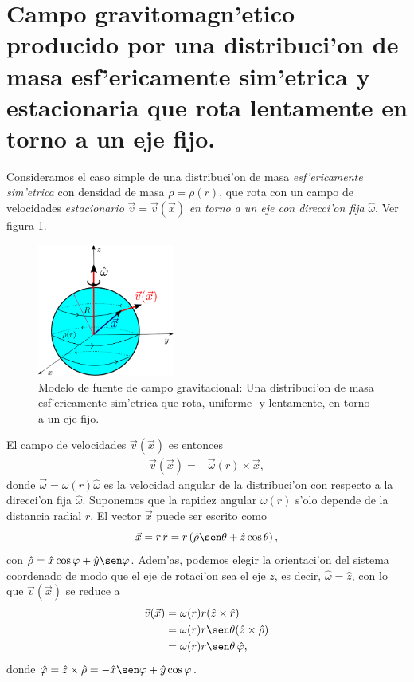 \section{Campo gravitomagn'etico producido por una distribuci'on de masa esf'ericamente sim'etrica y estacionaria que rota lentamente en torno a un eje fijo.}

Consideramos el caso simple de una distribuci'on de masa \textit{esf'ericamente sim'etrica} con densidad de masa $\rho =\rho (r)$, que rota con un campo de velocidades \textit{estacionario} $\vec{v}=\vec{v}(\vec{x})$ \textit{en torno a un eje con direcci'on fija} $\hat{\omega}$. Ver figura \ref{fig:fuente}.
\begin{figure}[H]
\centering
\includegraphics[angle=0,width=0.4\textwidth]{fig/fig-fuente.pdf}
\caption{Modelo de fuente de campo gravitacional: Una distribuci'on de masa esf'ericamente sim'etrica que rota, uniforme- y lentamente, en torno a un eje fijo.}
\label{fig:fuente}
\end{figure}

El campo de velocidades $\vec{v}(\vec{x})$ es entonces
\begin{align}
\vec{v}(\vec{x})={}&\vec{\omega}(r)\times\vec{x},
\end{align}
donde $\vec{\omega}=\omega(r)\hat{\omega}$ es la velocidad angular de la distribuci'on con respecto a la direcci'on fija $\hat{\omega}$. Suponemos que la rapidez angular $\omega(r)$ s'olo depende de la distancia radial $r$. El vector $\vec{x}$ puede ser escrito como
\begin{equation}
\vec{x}=r\, \hat{r}=r\left(\hat{\rho}\sen\theta +\hat{z}\cos\theta\right),
\end{equation}
con $\hat{\rho}=\hat{x}\cos\varphi+\hat{y}\sen\varphi$. Adem'as, podemos elegir la orientaci'on del sistema coordenado de modo que el eje de rotaci'on sea el eje $z$, es decir, $\hat{\omega}=\hat{z}$, con lo que $\vec{v}(\vec{x})$ se reduce a
\begin{align}
\vec{v}(\vec{x})={}&\omega(r)r(\hat{z}\times\hat{r})\\
 ={}&\omega(r)r\sen \theta (\hat{z}\times\hat{\rho})\\
 ={}&\omega(r)r\sen \theta\, \hat{\varphi} ,\label{campovelocidad}
\end{align}
donde $\hat{\varphi }=\hat{z}\times\hat{\rho}=-\hat{x}\sen\varphi +\hat{y}\cos\varphi $.

